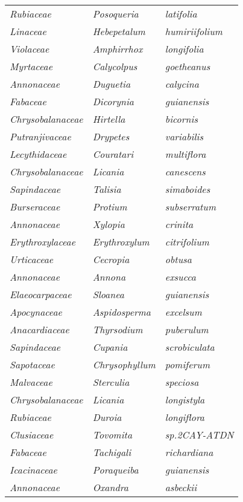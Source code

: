 \documentclass[fleqn,10pt]{ArtEcoFoG} %
\renewenvironment{table}{\begin{table*}}{\end{table*}\ignorespacesafterend}
\begin{document}
\begin{table}
\begin{tabular}[t]{lll}
\em{Rubiaceae} & \em{Posoqueria} & \em{latifolia}\\
\em{Linaceae} & \em{Hebepetalum} & \em{humiriifolium}\\
\em{Violaceae} & \em{Amphirrhox} & \em{longifolia}\\
\addlinespace
\em{Myrtaceae} & \em{Calycolpus} & \em{goetheanus}\\
\em{Annonaceae} & \em{Duguetia} & \em{calycina}\\
\em{Fabaceae} & \em{Dicorynia} & \em{guianensis}\\
\em{Chrysobalanaceae} & \em{Hirtella} & \em{bicornis}\\
\em{Putranjivaceae} & \em{Drypetes} & \em{variabilis}\\
\addlinespace
\em{Lecythidaceae} & \em{Couratari} & \em{multiflora}\\
\em{Chrysobalanaceae} & \em{Licania} & \em{canescens}\\
\em{Sapindaceae} & \em{Talisia} & \em{simaboides}\\
\em{Burseraceae} & \em{Protium} & \em{subserratum}\\
\em{Annonaceae} & \em{Xylopia} & \em{crinita}\\
\addlinespace
\em{Erythroxylaceae} & \em{Erythroxylum} & \em{citrifolium}\\
\em{Urticaceae} & \em{Cecropia} & \em{obtusa}\\
\em{Annonaceae} & \em{Annona} & \em{exsucca}\\
\em{Elaeocarpaceae} & \em{Sloanea} & \em{guianensis}\\
\em{Apocynaceae} & \em{Aspidosperma} & \em{excelsum}\\
\addlinespace
\em{Anacardiaceae} & \em{Thyrsodium} & \em{puberulum}\\
\em{Sapindaceae} & \em{Cupania} & \em{scrobiculata}\\
\em{Sapotaceae} & \em{Chrysophyllum} & \em{pomiferum}\\
\em{Malvaceae} & \em{Sterculia} & \em{speciosa}\\
\em{Chrysobalanaceae} & \em{Licania} & \em{longistyla}\\
\addlinespace
\em{Rubiaceae} & \em{Duroia} & \em{longiflora}\\
\em{Clusiaceae} & \em{Tovomita} & \em{sp.2CAY-ATDN}\\
\em{Fabaceae} & \em{Tachigali} & \em{richardiana}\\
\em{Icacinaceae} & \em{Poraqueiba} & \em{guianensis}\\
\em{Annonaceae} & \em{Oxandra} & \em{asbeckii}\\

\end{tabular}
\end{table}
\end{document}
